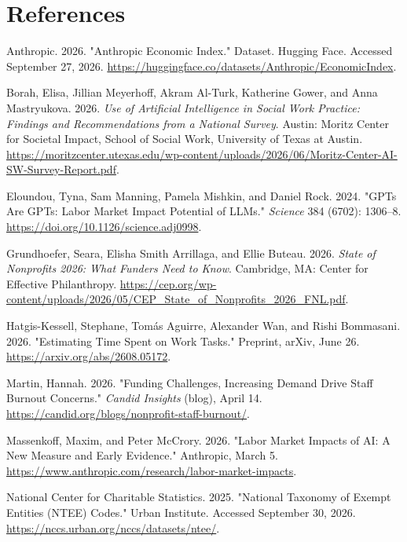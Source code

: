 \section*{References}
\begin{reflist}

\item Anthropic. 2026. "Anthropic Economic Index." Dataset. Hugging Face. Accessed September 27, 2026. \url{https://huggingface.co/datasets/Anthropic/EconomicIndex}.

\item Borah, Elisa, Jillian Meyerhoff, Akram Al-Turk, Katherine Gower, and Anna Mastryukova. 2026. \emph{Use of Artificial Intelligence in Social Work Practice: Findings and Recommendations from a National Survey}. Austin: Moritz Center for Societal Impact, School of Social Work, University of Texas at Austin. \url{https://moritzcenter.utexas.edu/wp-content/uploads/2026/06/Moritz-Center-AI-SW-Survey-Report.pdf}.

\item Eloundou, Tyna, Sam Manning, Pamela Mishkin, and Daniel Rock. 2024. "GPTs Are GPTs: Labor Market Impact Potential of LLMs." \emph{Science} 384 (6702): 1306--8. \url{https://doi.org/10.1126/science.adj0998}.

\item Grundhoefer, Seara, Elisha Smith Arrillaga, and Ellie Buteau. 2026. \emph{State of Nonprofits 2026: What Funders Need to Know}. Cambridge, MA: Center for Effective Philanthropy. \url{https://cep.org/wp-content/uploads/2026/05/CEP_State_of_Nonprofits_2026_FNL.pdf}.

\item Hatgis-Kessell, Stephane, Tomás Aguirre, Alexander Wan, and Rishi Bommasani. 2026. "Estimating Time Spent on Work Tasks." Preprint, arXiv, June 26. \url{https://arxiv.org/abs/2608.05172}.

\item Martin, Hannah. 2026. "Funding Challenges, Increasing Demand Drive Staff Burnout Concerns." \emph{Candid Insights} (blog), April 14. \url{https://candid.org/blogs/nonprofit-staff-burnout/}.

\item Massenkoff, Maxim, and Peter McCrory. 2026. "Labor Market Impacts of AI: A New Measure and Early Evidence." Anthropic, March 5. \url{https://www.anthropic.com/research/labor-market-impacts}.

\item National Center for Charitable Statistics. 2025. "National Taxonomy of Exempt Entities (NTEE) Codes." Urban Institute. Accessed September 30, 2026. \url{https://nccs.urban.org/nccs/datasets/ntee/}.


\end{reflist}
